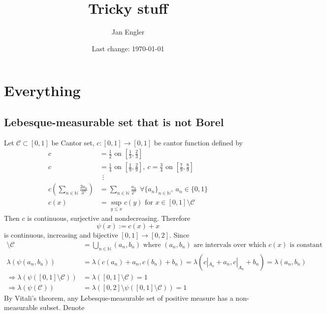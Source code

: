 \documentclass[12pt,a4paper]{article}
\title{Tricky stuff}
\author{Jan Engler}
\date{Last change: \today}
\renewcommand\:{\colon}
\begin{document}
\maketitle
\tableofcontents

\section{Everything}

\subsection{Lebesque-measurable set that is not Borel}
\par Let $\mathcal{C}\subset [0,1]$ be Cantor set, $c\:[0,1]\to[0,1]$ be cantor function defined by
\begin{align*}
	c &= \frac{1}{2} \text{ on } \left[\frac{1}{3},\frac{2}{3}\right] \\
	c &= \frac{1}{4} \text{ on } \left[\frac{1}{9},\frac{2}{9}\right], \ c=\frac{3}{4} \text{ on } \left[\frac{7}{9},\frac{8}{9}\right] \\
	  &\ \ \vdots \\
	c\left(\sum_{n\in \mathbb{N}}\frac{2a_n}{3^{n}}\right) &= \sum_{n\in \mathbb{N}}\frac{a_n}{2^n} \ \ \forall \{a_n\}_{n\in \mathbb{N}}, \ a_n\in\{0,1\} \\
	c(x) &= \sup_{y\leq x}c(y) \text{ for } x\in [0,1]\setminus \mathcal{C}
\end{align*}
Then $c$ is continuous, surjective and nondecreasing. Therefore
\begin{equation}\label{cantor+x}
  \psi(x) := c(x)+x
\end{equation}
is continuous, increasing and bijective $[0,1]\to[0,2].$ Since
\begin{align*}
	[0,1]\setminus\mathcal{C} &= \bigcup_{n\in \mathbb{N}}(a_n,b_n) \text{ where } (a_n,b_n) \text{ are intervals over which } c(x) \text{ is constant} \\
	\lambda\left(\psi\left(a_n,b_n\right)\right) &= \lambda(c(a_n)+a_n,c(b_n)+b_n)=\lambda(c|_{A_n}+a_n,c|_{A_n}+b_n)=\lambda(a_n,b_n) \\
	\Rightarrow \lambda(\psi([0,1]\setminus \mathcal{C}))&=\lambda([0,1]\setminus \mathcal{C})=1 \\
	\Rightarrow \lambda(\psi(\mathcal{C})) &= \lambda([0,2]\setminus \psi([0,1]\setminus \mathcal{C}))=1
\end{align*}
By Vitali's theorem, any Lebesque-measurable set of positive measure has a non-measurable subset. Denote 
\end{document}
